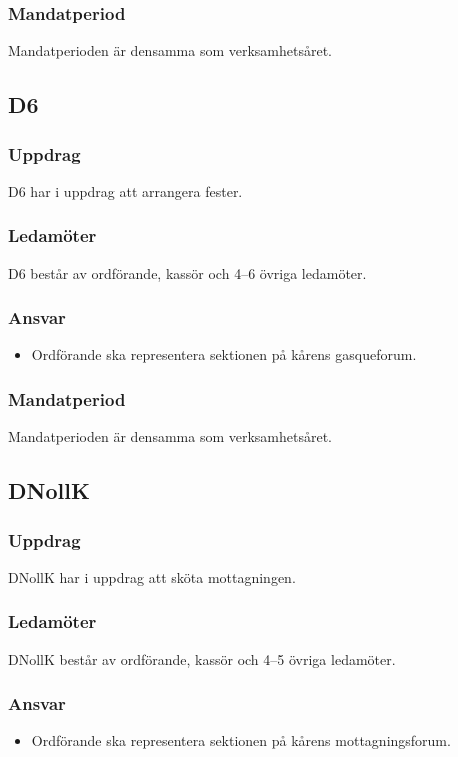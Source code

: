 \subsubsection{Mandatperiod}
Mandatperioden är densamma som verksamhetsåret. 

\subsection{D6}
\subsubsection{Uppdrag}
D6 har i uppdrag att arrangera fester. 
\subsubsection{Ledamöter}
D6 består av ordförande, kassör och 4--6 övriga ledamöter.
\subsubsection{Ansvar}
\begin{itemize}
    \item Ordförande ska representera sektionen på kårens gasqueforum.
\end{itemize}
\subsubsection{Mandatperiod}
Mandatperioden är densamma som verksamhetsåret. 

\subsection{DNollK}
\subsubsection{Uppdrag}
DNollK har i uppdrag att sköta mottagningen. 
\subsubsection{Ledamöter}
DNollK består av ordförande, kassör och 4--5 övriga ledamöter.
\subsubsection{Ansvar}
\begin{itemize}
    \item Ordförande ska representera sektionen på kårens mottagningsforum.
\end{itemize}
